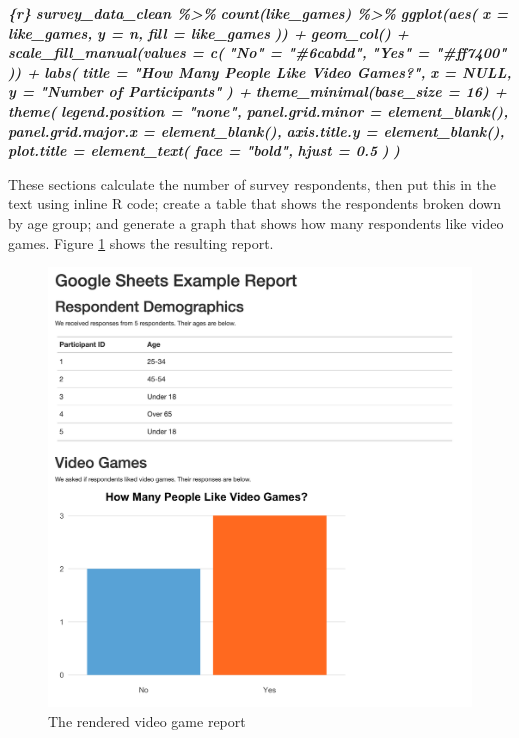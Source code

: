 \documentclass[
]{book}
\newenvironment{Shaded}{\begin{snugshade}}{\end{snugshade}}
\newcommand{\InformationTok}[1]{\textcolor[rgb]{0.56,0.35,0.01}{\textbf{\textit{#1}}}}
\begin{document}
\begin{Shaded}
\begin{Highlighting}[]
\InformationTok{\textasciigrave{}\textasciigrave{}\textasciigrave{}\{r\}}
\InformationTok{survey\_data\_clean \%\textgreater{}\%}
\InformationTok{  count(like\_games) \%\textgreater{}\%}
\InformationTok{  ggplot(aes(}
\InformationTok{    x = like\_games,}
\InformationTok{    y = n,}
\InformationTok{    fill = like\_games}
\InformationTok{  )) +}
\InformationTok{  geom\_col() +}
\InformationTok{  scale\_fill\_manual(values = c(}
\InformationTok{    "No" = "\#6cabdd",}
\InformationTok{    "Yes" = "\#ff7400"}
\InformationTok{  )) +}
\InformationTok{  labs(}
\InformationTok{    title = "How Many People Like Video Games?",}
\InformationTok{    x = NULL,}
\InformationTok{    y = "Number of Participants"}
\InformationTok{  ) +}
\InformationTok{  theme\_minimal(base\_size = 16) +}
\InformationTok{  theme(}
\InformationTok{    legend.position = "none",}
\InformationTok{    panel.grid.minor = element\_blank(),}
\InformationTok{    panel.grid.major.x = element\_blank(),}
\InformationTok{    axis.title.y = element\_blank(),}
\InformationTok{    plot.title = element\_text(}
\InformationTok{      face = "bold",}
\InformationTok{      hjust = 0.5}
\InformationTok{    )}
\InformationTok{  )}
\InformationTok{\textasciigrave{}\textasciigrave{}\textasciigrave{}}
\end{Highlighting}
\end{Shaded}

These sections calculate the number of survey respondents, then put this in the text using inline R code; create a table that shows the respondents broken down by age group; and generate a graph that shows how many respondents like video games. Figure \ref{fig:video-game-report} shows the resulting report.

\begin{figure}
\includegraphics[width=1\linewidth]{assets/video-game-report} \caption{The rendered video game report}\label{fig:video-game-report}
\end{figure}
\end{document}
